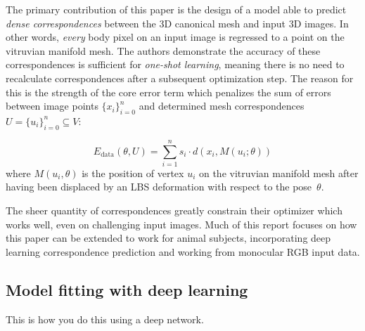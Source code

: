 The primary contribution of this paper is the design of a model able to predict \emph{dense correspondences} between the 3D canonical mesh and input 3D images. In other words, \emph{every} body pixel on an input image is regressed to a point on the vitruvian manifold mesh. The authors demonstrate the accuracy of these correspondences is sufficient for \emph{one-shot learning}, meaning there is no need to recalculate correspondences after a subsequent optimization step. The reason for this is the strength of the core error term which penalizes the sum of errors between image points $\{x_{i}\}_{i=0}^{n}$ and determined mesh correspondences $U = \{u_{i}\}_{i=0}^{n} \subseteq V$:

\begin{equation}
    E_{\text{data}}(\theta,U) =\sum_{i=1}^{n}s_{i} \cdot d(x_{i}, M(u_{i}; \theta))
\end{equation}
where $M(u_{i}, \theta)$ is the position of vertex $u_{i}$ on the vitruvian manifold mesh after having been displaced by an LBS deformation with respect to the pose~$\theta$. 

The sheer quantity of correspondences greatly constrain their optimizer which works well, even on challenging input images. Much of this report focuses on how this paper can be extended to work for animal subjects, incorporating deep learning correspondence prediction and working from monocular RGB input data.

\subsection{Model fitting with deep learning}

This is how you do this using a deep network. 



